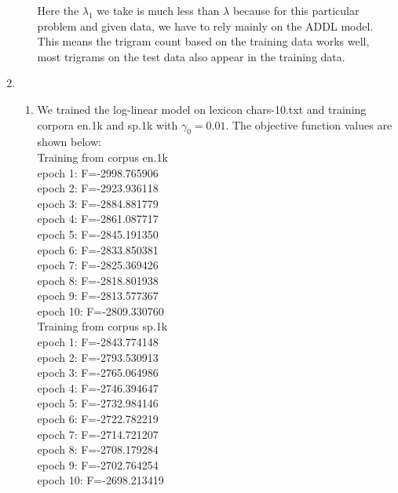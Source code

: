 \documentclass[10pt]{article}
\begin{document}
\begin{enumerate}
\begin{enumerate}
            Here the $\lambda_1$ we take is much less than $\lambda$ because for this particular problem and given data, we have to rely mainly on the ADDL model. This means the trigram count based on the training data works well, most trigrams on the test data also appear in the training data.
            

        \end{enumerate}
        
    \item 
        \begin{enumerate} %
            \addtocounter{enumii}{2}
            \item We trained the log-linear model on lexicon chars-10.txt and training corpora en.1k and sp.1k with $\gamma_0=0.01$. The objective function values are shown below:\\
            Training from corpus en.1k\\
            epoch 1: F=-2998.765906\\
            epoch 2: F=-2923.936118\\
            epoch 3: F=-2884.881779\\
            epoch 4: F=-2861.087717\\
            epoch 5: F=-2845.191350\\
            epoch 6: F=-2833.850381\\
            epoch 7: F=-2825.369426\\
            epoch 8: F=-2818.801938\\
            epoch 9: F=-2813.577367\\
            epoch 10: F=-2809.330760\\
            
            Training from corpus sp.1k\\
            epoch 1: F=-2843.774148\\
            epoch 2: F=-2793.530913\\
            epoch 3: F=-2765.064986\\
            epoch 4: F=-2746.394647\\
            epoch 5: F=-2732.984146\\
            epoch 6: F=-2722.782219\\
            epoch 7: F=-2714.721207\\
            epoch 8: F=-2708.179284\\
            epoch 9: F=-2702.764254\\
            epoch 10: F=-2698.213419\\
            

\end{enumerate}
\end{enumerate}
\end{document}
